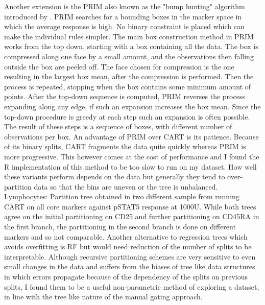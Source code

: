 Another extension is the \gls{PRIM} also known as the "bump hunting" algorithm introduced by \citet{Friedman:1999iy}.
\gls{PRIM} searches for a bounding boxes in the marker space in which the average response is high.
No binary constraint is placed which can make the individual rules simpler.
The main box construction method in PRIM works from the top down, starting with a box containing all the data.
The box is compressed along one face by a small amount, and the observations then falling outside the box are peeled off.
The face chosen for compression is the one resulting in the largest box mean, after the compression is performed.
Then the process is repeated, stopping when the box contains some minimum amount of points.
After the top-down sequence is computed, PRIM reverses the process expanding along any edge, if such an expansion
increases the box mean.
Since the top-down procedure is greedy at each step such an expansion is often possible.
The result of these steps is a sequence of boxes, with different number of observations per box.
An advantage of PRIM over CART is its patience.  Because of its binary splits, CART fragments the data quite quickly
whereas PRIM is more progressive.
This however comes at the cost of performance and I found the R implementation of this method to be too slow to run on
my dataset.
%
How well these variants perform depends on the data but generally they tend to over-partition data so that the bins are uneven or the tree is unbalanced.
{ Lymphocytes: Partition tree obtained in two different sample from running CART on all core markers against pSTAT5 response at 1000U. }
{
  While both trees agree on the initial partitioning on CD25 and further partitioning on CD45RA in the first branch,
  the partitioning in the second branch is done on different markers and so not comparable.
} 
Another alternative to regression trees which avoids overfitting is \gls{RF} but would need reduction of the number of splits to be interpretable.
Although recursive partitioning schemes are very sensitive to even small changes in the data and suffers from the biases of tree like data structures in which errors propagate because of the dependency of the splits on previous splits,
I found them to be a useful non-parametric method of exploring a dataset, in line with the tree like nature of the manual gating approach.

